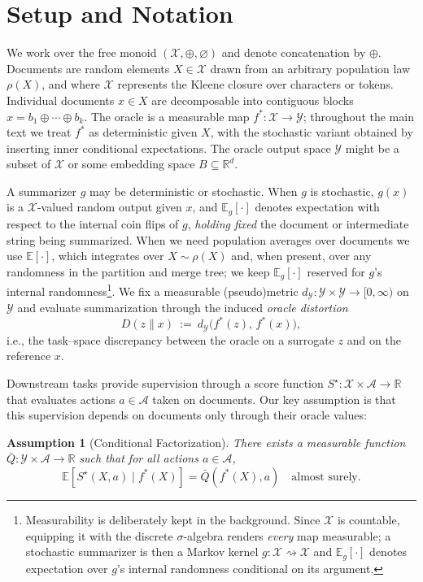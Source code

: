 \documentclass[11pt]{article}
\newtheorem{assumption}{Assumption}
\newcommand{\Strings}{\mathcal{X}}       %
\newcommand{\Y}{\mathcal{Y}}               %
\newcommand{\A}{\mathcal{A}}               %
\newcommand{\fstar}{f^*}               %
\newcommand{\sstar}{S^\star}               %
\newcommand{\E}{\mathbb{E}}
\newcommand{\concat}{\oplus}                    %
\newcommand{\metric}{d_{\Y}}
\newcommand{\emptystr}{\varnothing}              %
\newcommand{\Law}{\rho}
\newcommand{\Eg}{\E_g}     %
\begin{document}
\section{Setup and Notation}\label{sec:setup}

We work over the free monoid $(\Strings,\concat,\emptystr)$ and denote concatenation by $\concat$. 
Documents are random elements $X\in\Strings$ drawn from an arbitrary population law $\Law(X)$, and where $\Strings$ represents the Kleene closure over characters or tokens. Individual documents $x\in X$ are decomposable into contiguous blocks $x=b_1\concat\cdots\concat b_k$. The oracle is a measurable map $\fstar:\Strings\to\Y$; throughout the main text we treat $\fstar$ as deterministic given $X$, with the stochastic variant obtained by inserting inner conditional expectations. The oracle output space $\Y$ might be a subset of $\Strings$ or some embedding space $B\subseteq\mathbb{R}^d$.  

A summarizer $g$ may be deterministic or stochastic. When $g$ is stochastic, $g(x)$ is a $\Strings$-valued random output given $x$, and $\Eg[\cdot]$ denotes expectation with respect to the internal coin flips of $g$, \emph{holding fixed} the document or intermediate string being summarized. When we need population averages over documents we use $\E[\cdot]$, which integrates over $X\sim\Law(X)$ and, when present, over any randomness in the partition and merge tree; we keep $\Eg[\cdot]$ reserved for $g$'s internal randomness\footnote{Measurability is deliberately kept in the background. Since $\Strings$ is countable, equipping it with the discrete $\sigma$-algebra renders \emph{every} map measurable; a stochastic summarizer is then a Markov kernel $g:\Strings\rightsquigarrow\Strings$ and $\Eg[\cdot]$ denotes expectation over $g$'s internal randomness conditional on its argument.}.
We fix a measurable (pseudo)metric $\metric:\Y\times\Y\to[0,\infty)$ on $\Y$ and evaluate summarization through the induced
\emph{oracle distortion}
\[
D(z\|x)\ :=\ \metric\!\big(\fstar(z),\,\fstar(x)\big),
\]
i.e., the task–space discrepancy between the oracle on a surrogate $z$ and on the reference $x$.

Downstream tasks provide supervision through a score function $\sstar: \Strings \times \A \to \mathbb{R}$ that evaluates actions $a \in \A$ taken on documents. Our key assumption is that this supervision depends on documents only through their oracle values:

\begin{assumption}[Conditional Factorization]\label{ass:CF}
There exists a measurable function $\bar{Q}: \Y \times \A \to \mathbb{R}$ such that for all actions $a \in \A$,
\[
\E[\sstar(X, a) \mid \fstar(X)] = \bar{Q}(\fstar(X), a) \quad \text{almost surely}.
\]
\end{assumption}
\end{document}
